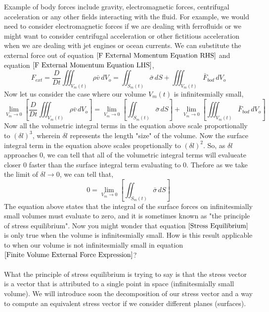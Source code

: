 Example of body forces include gravity, electromagnetic forces, centrifugal acceleration or any other fields interacting with the fluid.
For example, we would need to consider electromagnetic forces if we are dealing with ferrofluids or we might want to consider centrifugal acceleration or other fictitious acceleration when we are dealing with jet engines or ocean currents.
We can substitute the external force out of equation $\ref{F External Momentum Equation RHS}$ and equation $\ref{F External Momentum Equation LHS}$,
\begin{equation}F_{ext} = \frac{D}{Dt}\iiint^{}_{V_{m}(t)} \rho \bar{v} \,dV_{o} = \iint^{}_{S_{m}(t)} \bar{\sigma} \,dS + \iiint^{}_{V_{m}(t)} \bar{F}_{bod} \,dV_{o} \label{Finite Volume External Force Expression}\end{equation}
Now let us consider the case where our volume $V_{m}(t)$ is infinitesmially small,
$$\lim_{V_{m}  \to 0}\left[\frac{D}{Dt}\iiint^{}_{V_{m}(t)} \rho \bar{v} \,dV_{o}\right] = \lim_{V_{m} \to 0}\left[\iint^{}_{S_{m}(t)} \bar{\sigma} \,dS\right] + \lim_{V_{m} \to 0}\left[\iiint^{}_{V_{m}(t)} \bar{F}_{bod} \,dV_{o}\right] $$
Now all the volumetric integral terms in the equation above scale proportionally to $(\delta l)^{3}$, wherein $\delta l$ represents the length "size" of the volume.
Now the surface integral term in the equation above scales proprtionally to $(\delta l)^{2}$.
So, as $\delta l$ approaches $0$, we can tell that all of the volumetric integral terms will evalueate closer $0$ faster than the surface integral term evaluating to $0$.
Thefore as we take the limit of $\delta l \to 0$, we can tell that,
\begin{equation}0 = \lim_{V_{m} \to 0}\left[\iint^{}_{S_{m}(t)} \bar{\sigma} \,dS\right] \label{Stress Equilibrium}\end{equation}
The equation above states that the integral of the surface forces on infinitesmially small volumes must evaluate to zero, and it is sometimes known as "the principle of stress equilibrium".
Now you might wonder that equation $\ref{Stress Equilibrium}$ is only true when the volume is infinitesmially small.
How is this result applicable to when our volume is not infinitesmially small in equation $\ref{Finite Volume External Force Expression}$?
\\~\\What the principle of stress equilibrium is trying to say is that the stress vector is a vector that is attributed to a single point in space (infinitesmially small volume).
We will introduce soon the decomposition of our stress vector and a way to compute an equivalent stress vector if we consider different planes (surfaces). 
